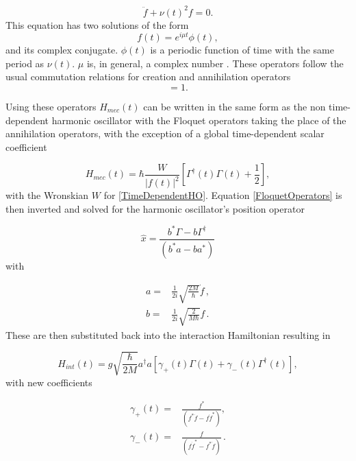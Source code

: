 \documentclass[reprint, amsmath,amssymb, aps,pra]{revtex4-1}
\begin{document}
\begin{equation} \label{TimeDependentHO}
\ddot{f} + \nu(t)^2f=0.
\end{equation} This equation has two solutions \cite{HanngiFM} of the form
\begin{equation}
f(t) = e^{i\mu t}\phi(t), 
\end{equation} and its complex conjugate. $\phi(t)$ is a periodic function of time with the same period as $\nu(t)$.  $\mu$ is, in general, a complex number \cite{WardFT}. These operators follow the usual commutation relations for creation and annihilation operators
\begin{equation}
[\Gamma(t)^\dagger,\Gamma(t)]=1.
\end{equation}

 Using these operators $H_{mec}(t)$ can be written in the same form as the non time-dependent harmonic oscillator with the Floquet operators taking the place of the annihilation operators, with the exception of a global time-dependent scalar coefficient  \cite{BrownPT}

\begin{equation}
H_{mec}(t) = \hbar\frac{W}{|f(t)|^2}\left[\Gamma^\dagger(t)\Gamma(t) + \frac{1}{2}\right],
\end{equation}
with the Wronskian $W$ for \eqref{TimeDependentHO}. Equation
\eqref{FloquetOperators} is then inverted and solved for the harmonic
oscillator's position operator \cite{TesisMaestria}

\begin{equation}
\hat{x} = \frac{b^* \Gamma - b\Gamma^\dagger}{(b^*a-ba^*)}
\end{equation} with

\begin{align}
a =&  \frac{1}{2i}\sqrt{\frac{2M}{\hbar}}\dot{f}\, , \\
b =&  \frac{1}{2i}\sqrt{\frac{2}{M\hbar}}f\, .
\end{align}
These are then substituted back into the interaction Hamiltonian
resulting in

\begin{equation}
H_{int}(t) = g\sqrt{\frac{\hbar}{2M}}a^\dagger a[\gamma_+(t)\Gamma (t) +\gamma_-(t)\Gamma^\dagger (t)],
\end{equation} with new coefficients

\begin{align*}
\gamma_+(t)=&\frac{f^*}{(f^*\dot{f}-f\dot{f}^*)},\\
\gamma_-(t)=&\frac{f}{(f\dot{f}^*-f^*\dot{f})}\, .
\end{align*} 
\end{document}
